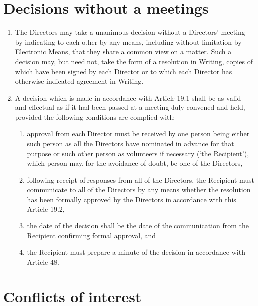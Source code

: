 \documentclass[a4paper,12pt]{article}
\begin{document}
\section{Decisions without a meetings}

\begin{enumerate}
  \item The Directors may take a unanimous decision without a Directors’ meeting by indicating to each other by any means, including without limitation by Electronic Means, that they share a common view on a matter. Such a decision may, but need not, take the form of a resolution in Writing, copies of which have been signed by each Director or to which each Director has otherwise indicated agreement in Writing.
  \item A decision which is made in accordance with Article 19.1 shall be as valid and effectual as if it had been passed at a meeting duly convened and held, provided the following conditions are complied with:
  \begin{enumerate}
    \item approval from each Director must be received by one person being either such person as all the Directors have nominated in advance for that purpose or such other person as volunteers if necessary (`the Recipient'), which person may, for the avoidance of doubt, be one of the Directors,
    \item	following receipt of responses from all of the Directors, the Recipient must communicate to all of the Directors by any means whether the resolution has been formally approved by the Directors in accordance with this Article 19.2,
    \item	the date of the decision shall be the date of the communication from the Recipient confirming formal approval, and
    \item the Recipient must prepare a minute of the decision in accordance with Article 48.
  \end{enumerate}
\end{enumerate}

\section{Conflicts of interest}
\end{document}
